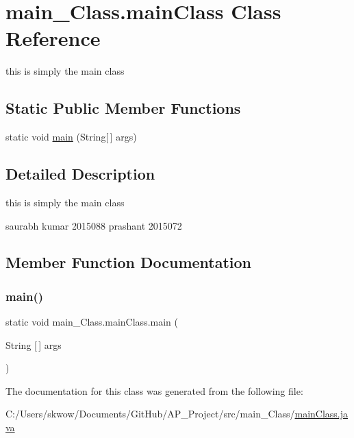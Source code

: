 \hypertarget{classmain___class_1_1main_class}{}\section{main\+\_\+\+Class.\+main\+Class Class Reference}
\label{classmain___class_1_1main_class}


this is simply the main class  


\subsection*{Static Public Member Functions}
\begin{DoxyCompactItemize}
\item 
static void \hyperlink{classmain___class_1_1main_class_ab3827b8cc7f9a5b8f432ee476700b844}{main} (String\mbox{[}$\,$\mbox{]} args)
\end{DoxyCompactItemize}


\subsection{Detailed Description}
this is simply the main class 

saurabh kumar 2015088 prashant 2015072 

\subsection{Member Function Documentation}
\hypertarget{classmain___class_1_1main_class_ab3827b8cc7f9a5b8f432ee476700b844}{}\label{classmain___class_1_1main_class_ab3827b8cc7f9a5b8f432ee476700b844} 
\subsubsection{\texorpdfstring{main()}{main()}}
{\footnotesize\ttfamily static void main\+\_\+\+Class.\+main\+Class.\+main (\begin{DoxyParamCaption}\item[{String \mbox{[}$\,$\mbox{]}}]{args }\end{DoxyParamCaption})\hspace{0.3cm}{\ttfamily [static]}}



The documentation for this class was generated from the following file\+:\begin{DoxyCompactItemize}
\item 
C\+:/\+Users/skwow/\+Documents/\+Git\+Hub/\+A\+P\+\_\+\+Project/src/main\+\_\+\+Class/\hyperlink{main_class_8java}{main\+Class.\+java}\end{DoxyCompactItemize}
